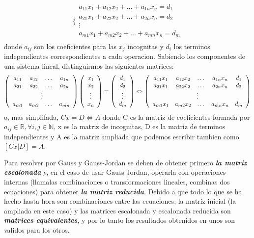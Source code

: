 \documentclass[11pt,a4paper]{article}
\begin{document}
$$\lbrace\begin{array}{c}
a_{11}x_1+a_{12}x_2+\dots+a_{1n}x_n=d_1\\
a_{21}x_1+a_{22}x_2+\dots+a_{2n}x_n=d_2\\
\vdots\\
a_{m1}x_1+a_{m2}x_2+\dots+a_{mn}x_n=d_m\\
\end{array}$$ donde $a_{ij}$ son los coeficientes para las $x_j$ incognitas y $d_i$ los terminos independientes correspondientes a cada operacion. Sabiendo los componentes de una sistema lineal, distinguirmos las siguientes matrices:
$$\left( \begin{array}{c c c c}
a_{11}&a_{12}&\dots&a_{1n}\\
a_{21}&a_{22}&\dots&a_{2n}\\
\multicolumn{4}{c}{\vdots}\\
a_{m1}&a_{m2}&\dots&a_{mn}\\
\end{array}\right)\left( \begin{array}{c}
x_1\\
x_2\\
\vdots\\
x_n\\
\end{array}\right)=\left( \begin{array}{c}
d_1\\
d_2\\
\vdots\\
d_m\\
\end{array}\right)\Leftrightarrow\left( \begin{array}{c c c c c}
a_{11}x_1&a_{12}x_2&\dots&a_{1n}x_n&d_1\\
a_{21}x_1&a_{22}x_2&\dots&a_{2n}x_n&d_2\\
\multicolumn{5}{c}{\vdots}\\
a_{m1}x_1&a_{m2}x_2&\dots&a_{mn}x_n&d_m\\
\end{array}\right)$$ o, mas simplifada, $Cx=D\Leftrightarrow A$ donde C es la matriz de coeficientes formada por $a_{ij}\in\mathbb{R}, \forall i,j\in\mathbb{N}$, x es la matriz de incognitas, D es la matriz de terminos independientes y A es la matriz ampliada que podemos escribir tambien como $[Cx|D]= A$.

Para resolver por Gauss y Gauss-Jordan se deben de obtener primero \textbf{\textit{la matriz escalonada}} y, en el caso de usar Gauss-Jordan, operarla con operaciones internas (llamalas combinaciones o transformaciones lineales, combinas dos ecuaciones) para obtener \textbf{\textit{la matriz reducida}}. Debido a que todo lo que se ha hecho hasta hora son combinaciones entre las ecuaciones, la matriz inicial (la ampliada en este caso) y las matrices escalonada y escalonada reducida son \textbf{\textit{matrices equivalentes}}, y por lo tanto los resultados obtenidos en unos son validos para los otros.
\end{document}
